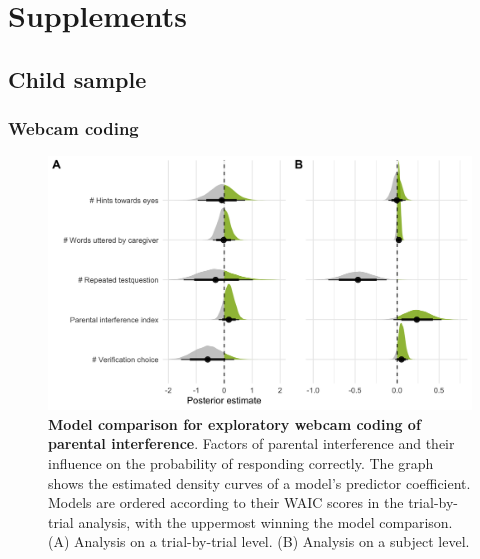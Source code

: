 \documentclass[
  man,floatsintext]{apa6}
\begin{document}
\endgroup

\newpage

\hypertarget{supplements}{%
\section{Supplements}\label{supplements}}

\hypertarget{child-sample}{%
\subsection{Child sample}\label{child-sample}}

\hypertarget{webcam-coding}{%
\subsubsection{Webcam coding}\label{webcam-coding}}




\begin{figure}

{\centering \includegraphics[width=1\linewidth]{../figures/supplements_webcamcoding_draws} 

}

\caption{\textbf{Model comparison for exploratory webcam coding of parental interference}.
Factors of parental interference and their influence on the probability of responding correctly. The graph shows the estimated density curves of a model's predictor coefficient. Models are ordered according to their WAIC scores in the trial-by-trial analysis, with the uppermost winning the model comparison. (A) Analysis on a trial-by-trial level. (B) Analysis on a subject level.}\label{fig:fig5}
\end{figure}
\end{document}
